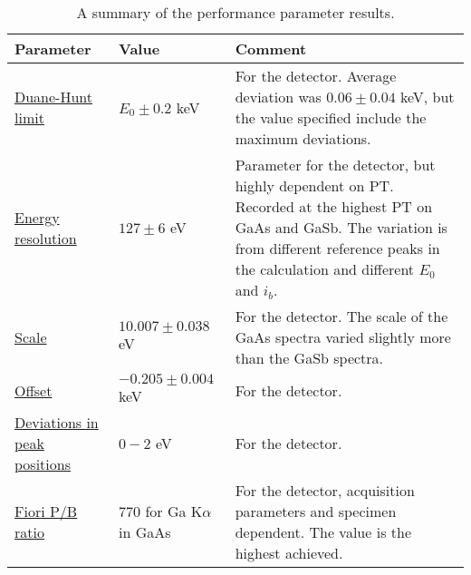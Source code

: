 \begin{table}[hbpt]
    \begin{center}
        \caption{
            A summary of the performance parameter results.
        }
        \renewcommand*{\arraystretch}{1.2}
        \label{tab:results:performance_summary}
        \begin{tabular}{p{2.5cm}p{4cm}p{7cm}}
            \hline
            \textbf{Parameter}                                            & \textbf{Value}                 & \textbf{Comment}                                                                                                                                                                                       \\
            \hline%
            \hyperref[results:duane_hunt]{Duane-Hunt limit}               & $E_0 \pm 0.2$ keV              & For the detector. Average deviation was $0.06 \pm0.04$ keV, but the value specified include the maximum deviations.                                                                                    \\
            \hyperref[results:energy_resolution]{Energy resolution}       & $127 \pm6$ eV                  & Parameter for the detector, but highly dependent on PT. Recorded at the highest PT on GaAs and GaSb. The variation is from different reference peaks in the calculation and different $E_0$ and $i_b$. \\
            \hyperref[results:scaleoffset]{Scale}                         & $10.007 \pm0.038$ eV           & For the detector. The scale of the GaAs spectra varied slightly more than the GaSb spectra.                                                                                                            \\
            \hyperref[results:scaleoffset]{Offset}                        & $- 0.205 \pm0.004$ keV         & For the detector.                                                                                                                                                                                      \\
            \hyperref[results:scaleoffset]{Deviations in peak positions}  & $0-2$ eV                       & For the detector.                                                                                                                                                                                      \\
            \hyperref[results:fiori]{Fiori P/B ratio}                     & $770$ for Ga K$\alpha$ in GaAs & For the detector, acquisition parameters and specimen dependent. The value is the highest achieved.                                                                                                    \\

\end{tabular}
\end{center}
\end{table}
